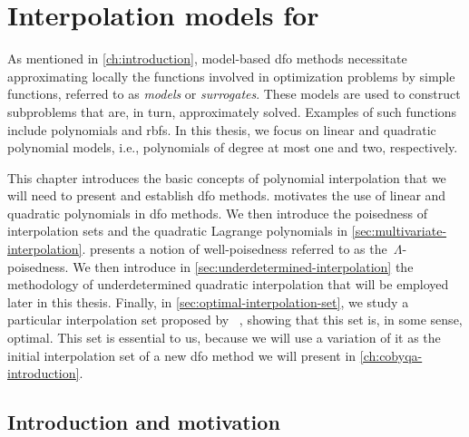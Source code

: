 %
%
%
\chapter{Interpolation models for }
\label{ch:interpolation}

As mentioned in \cref{ch:introduction}, model-based \gls{dfo} methods necessitate approximating locally the functions involved in optimization problems by simple functions, referred to as \emph{models} or \emph{surrogates}.
These models are used to construct subproblems that are, in turn, approximately solved.
Examples of such functions include polynomials and \glspl{rbf}.
In this thesis, we focus on linear and quadratic polynomial models, i.e., polynomials of degree at most one and two, respectively.

This chapter introduces the basic concepts of polynomial interpolation that we will need to present and establish \gls{dfo} methods.
 motivates the use of linear and quadratic polynomials in \gls{dfo} methods.
We then introduce the poisedness of interpolation sets and the quadratic Lagrange polynomials in \cref{sec:multivariate-interpolation}.
 presents a notion of well-poisedness referred to as the~$\Lambda$-poisedness.
We then introduce in \cref{sec:underdetermined-interpolation} the methodology of underdetermined quadratic interpolation that will be employed later in this thesis.
Finally, in \cref{sec:optimal-interpolation-set}, we study a particular interpolation set proposed by \citeauthor{Powell_2006}~\cite{Powell_2006}, showing that this set is, in some sense, optimal.
This set is essential to us, because we will use a variation of it as the initial interpolation set of a new \gls{dfo} method we will present in \cref{ch:cobyqa-introduction}.

\section{Introduction and motivation}
\label{sec:interpolation-introduction}

